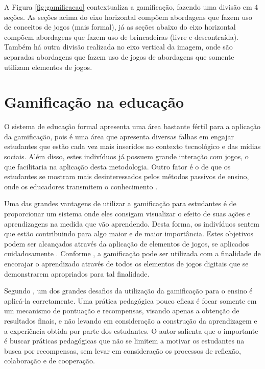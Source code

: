 \documentclass[
	12pt,				%
	oneside,			%
	a4paper,			%
	english,			%
	french,				%
	spanish,			%
	brazil,				%
	]{abntex2}
\begin{document}
A Figura \ref{fig:gamificacao} contextualiza a gamificação, fazendo uma divisão em 4 seções. As seções acima do eixo horizontal compõem abordagens que fazem uso de conceitos de jogos (mais formal), já as seções abaixo do eixo horizontal compõem abordagens que fazem uso de brincadeiras (livre e descontraída). Também há outra divisão realizada no eixo vertical da imagem, onde são separadas abordagens que fazem uso de jogos  de abordagens que somente utilizam elementos de jogos.

\section{Gamificação na educação}

O sistema de educação formal apresenta uma área bastante fértil para a aplicação da gamificação, pois é uma área que apresenta diversas falhas em engajar estudantes que estão cada vez mais inseridos no contexto tecnológico e das mídias sociais. Além disso, estes indivíduos já possuem grande interação com jogos, o que facilitaria na aplicação desta metodologia. Outro fator é o de que os estudantes se mostram mais desinteressados pelos métodos passivos de ensino, onde os educadores transmitem o conhecimento \cite{fardo2013gamificaccao}. 

Uma das grandes vantagens de utilizar a gamificação para estudantes é de proporcionar um sistema onde eles consigam visualizar o efeito de suas ações e aprendizagens na medida que vão aprendendo. Desta forma, os indivíduos sentem que estão contribuindo para algo maior e de maior importância. Estes objetivos podem ser alcançados através da aplicação de elementos de jogos, se aplicados cuidadosamente \cite{fardo2013gamificaccao}. Conforme \citet{kaap:2014}, a gamificação pode ser utilizada com a finalidade de encorajar o aprendizado através de todos os elementos de jogos digitais que se demonstrarem apropriados para tal finalidade.  

Segundo \citet{fardo2013gamificaccao}, um dos grandes desafios da utilização da gamificação para o ensino é aplicá-la corretamente. Uma prática pedagógica pouco eficaz é focar somente em um mecanismo de pontuação e recompensas, visando apenas a obtenção de resultados finais, e não levando em consideração a construção da aprendizagem e a experiência obtida por parte dos estudantes. O autor salienta que o importante é buscar práticas pedagógicas que não se limitem a motivar os estudantes na busca por recompensas, sem levar em consideração os processos de reflexão, colaboração e de cooperação.
\end{document}
